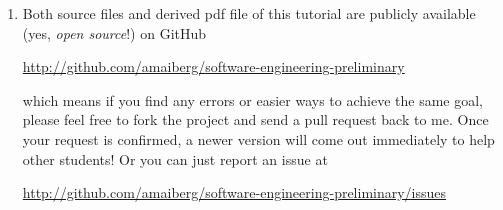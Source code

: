 \documentclass[oneside]{memoir}
\begin{document}
\begin{titlingpage}
\begin{minipage}{1.2\textwidth}
\begin{enumerate}
\item Both source files and derived pdf file of this tutorial are publicly
available (yes, \emph{open source}!) on GitHub

\url{http://github.com/amaiberg/software-engineering-preliminary}

which means if you find any errors or easier ways to achieve the same goal,
please feel free to fork the project and send a pull request back to me. Once
your request is confirmed, a newer version will come out immediately to help
other students! Or you can just report an issue at

\url{http://github.com/amaiberg/software-engineering-preliminary/issues}

\end{enumerate}

\end{minipage}
\hspace{-0.1\textwidth}
\end{titlingpage}






\end{document}
